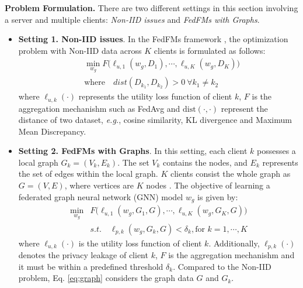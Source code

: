 \textbf{Problem Formulation.} There are two different settings in this section involving a server and multiple clients: \textit{Non-IID issues} and \textit{FedFMs with Graphs}.

\begin{itemize}
  \item  \textbf{Setting 1. Non-IID issues}. In the FedFMs framework \cite{zhang2021federated,fu2022federated}, the optimization problem with Non-IID data across $K$ clients is formulated as follows:
\begin{equation}
\begin{aligned}  
&\min_{w_g}F\Big(\ell_{u,1}(w_g,D_1), \cdots, \ell_{u,K}(w_g,D_K) \Big) \\  
&\text{where}\quad dist(D_{k_1}, D_{k_2})>0\ \forall k_1\neq k_2
\end{aligned}
\end{equation}
where \(\ell_{u,k}(\cdot)\) represents the utility loss function of client \(k\), $F$ is the aggregation mechanishm such as FedAvg and $\text{dist}(\cdot, \cdot)$ represent the distance of two dataset, \textit{e.g.},  cosine similarity, KL divergence and Maximum Mean Discrepancy.

  \item \textbf{Setting 2. FedFMs with Graphs}. In this setting, each client \(k\) possesses a local graph \(G_k=(V_k, E_k)\). The set \(V_k\) contains the nodes, and \(E_k\) represents the set of edges within the local graph. $K$ clients consist the whole graph as $G =(V ,E)$, where vertices are $K$ nodes \cite{baek2023personalized}. The objective of learning a federated graph neural network (GNN) model \(w_g\) is given by:
\begin{equation}\label{eq:graph}
\begin{split}
\min_{w_g}&F\Big(\ell_{u,1}(w_g, G_1, G), \cdots, \ell_{u,K}(w_g, G_K, G) \Big)\\
& s.t.\quad \ell_{p,k}(w_g, G_k, G)<\delta_k, \text{for }k=1,\cdots,K
    \end{split}
\end{equation}
where \(\ell_{u,k}(\cdot)\) is the utility loss function of client \(k\). Additionally, $\ell_{p,k}(\cdot)$ denotes the privacy leakage of client $k$, $F$ is the aggregation mechanishm and it must be within a predefined threshold $\delta_k$. Compared to the Non-IID problem, Eq. \eqref{eq:graph} considers the graph data $G$ and $G_k$.
\end{itemize}





